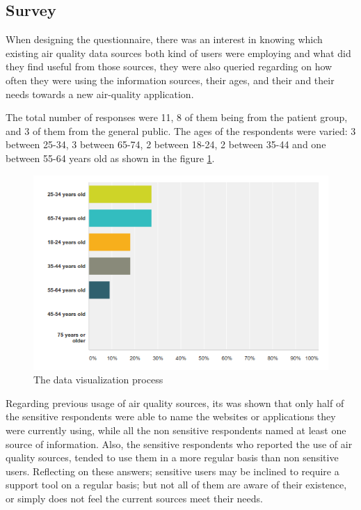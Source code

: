 \subsection{Survey}

When designing the questionnaire, there was an interest in knowing which existing air quality data sources both kind of users were employing and what did they find useful from those sources, they were also queried regarding on how often they were using the information sources, their ages, and their and their needs towards a new air-quality application.

The total number of responses were 11, 8 of them being from the patient group, and 3 of them from the general public. The ages of the respondents were varied: 3 between 25-34, 3 between 65-74, 2 between 18-24, 2 between 35-44 and one between 55-64 years old as shown in the figure \ref{fig:survey_ages}. 

\begin{figure}[H]
\begin{adjustbox}{width=.6\textwidth,center=\textwidth}
  \centering
  \includegraphics[scale=1]{images/ages_survey.png}
\end{adjustbox}
  \caption[The data visualization process \cite{KeimDaniel2010} ]{The data visualization process \cite{KeimDaniel2010} }
  \label{fig:survey_ages}
\end{figure}

Regarding previous usage of air quality sources, its was shown that only half of the sensitive respondents were able to name the websites or applications they were currently using, while all the non sensitive respondents named at least one source of information. Also, the sensitive respondents who reported the use of air quality sources, tended to use them in a more regular basis than non sensitive users. Reflecting on these answers; sensitive users may be inclined to require a support tool on a regular basis; but not all of them are aware of their existence, or simply does not feel the current sources meet their needs. 

